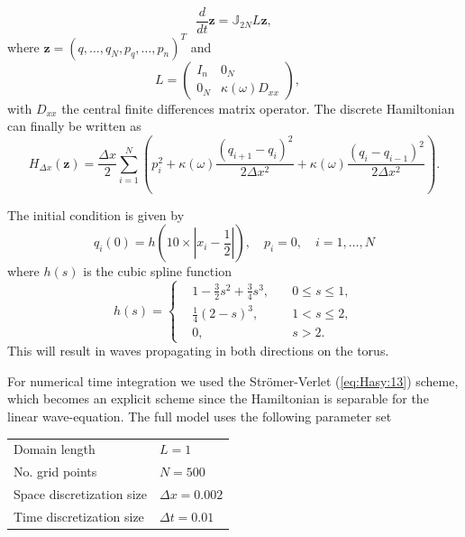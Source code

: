 \begin{equation} \label{eq:NuRe:5}
	\frac{d}{dt} \mathbf z = \mathbb{J}_{2N} L\mathbf z,
\end{equation}
where $\mathbf z=(q,\dots,q_N,p_q,\dots,p_n)^T$ and
\begin{equation} \label{eq:NuRe:6}
L = 
\begin{pmatrix}
	I_n & 0_N \\
	0_N & \kappa(\omega)D_{xx}
\end{pmatrix},\quad 
\end{equation}
with $D_{xx}$ the central finite differences matrix operator. The discrete Hamiltonian can finally be written as
\begin{equation} \label{eq:NuRe:7}
	H_{\Delta x}(\mathbf z) = \frac{\Delta x}2 \sum_{i=1}^{N} \left( p_i^2 + \kappa(\omega) \frac{(q_{i+1} - q_i)^2}{2\Delta x ^ 2} + \kappa(\omega) \frac{(q_{i} - q_{i-1})^2}{2\Delta x ^ 2} \right).
\end{equation}

The initial condition is given by
\begin{equation} \label{eq:NuRe:8}
	q_i(0) = h( 10\times|x_i - \frac{1}{2}| ), \quad p_i = 0, \quad i=1,\dots,N
\end{equation}
where $h(s)$ is the cubic spline function
\begin{equation} \label{eq:NuRe:9}
h(s) = 
\left\{
\begin{aligned}
& 1 - \frac{3}{2}s^2 + \frac{3}{4}s^3, \quad & 0\leq s \leq 1, \\
& \frac{1}{4}(2-s)^3, & 1< s \leq 2, \\
& 0, & s > 2.
\end{aligned}
\right.
\end{equation}
This will result in waves propagating in both directions on the torus.

For numerical time integration we used the Str\"omer-Verlet (\ref{eq:Hasy:13}) scheme, which becomes an explicit scheme since the Hamiltonian is separable for the linear wave-equation. The full model uses the following parameter set \vspace{0.5cm}
\begin{center}
\begin{tabular}{|l|l|}
\hline
Domain length & $L = 1$ \\
No. grid points & $N = 500$ \\
Space discretization size & $\Delta x = 0.002$ \\
Time discretization size & $\Delta t = 0.01$ \\
\hline
\end{tabular}
\end{center}
\vspace{0.5cm}

